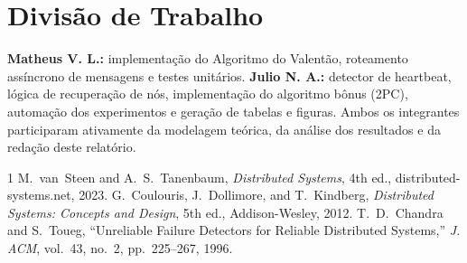 \documentclass[journal]{IEEEtran}
\begin{document}
\section{Divisão de Trabalho}
\textbf{Matheus V. L.:} implementação do Algoritmo do Valentão, roteamento assíncrono de mensagens e testes unitários. \textbf{Julio N. A.:} detector de heartbeat, lógica de recuperação de nós, implementação do algoritmo bônus (2PC), automação dos experimentos e geração de tabelas e figuras. Ambos os integrantes participaram ativamente da modelagem teórica, da análise dos resultados e da redação deste relatório.

\begin{thebibliography}{1}
 M.~van~Steen and A.~S.~Tanenbaum, \emph{Distributed
Systems}, 4th ed., distributed-systems.net, 2023.
 G.~Coulouris, J.~Dollimore, and T.~Kindberg,
\emph{Distributed Systems: Concepts and Design}, 5th ed., Addison-Wesley, 2012.
 T.~D.~Chandra and S.~Toueg, ``Unreliable Failure Detectors for
Reliable Distributed Systems,'' \emph{J. ACM}, vol.~43, no.~2, pp.~225--267, 1996.
\end{thebibliography}
\end{document}
